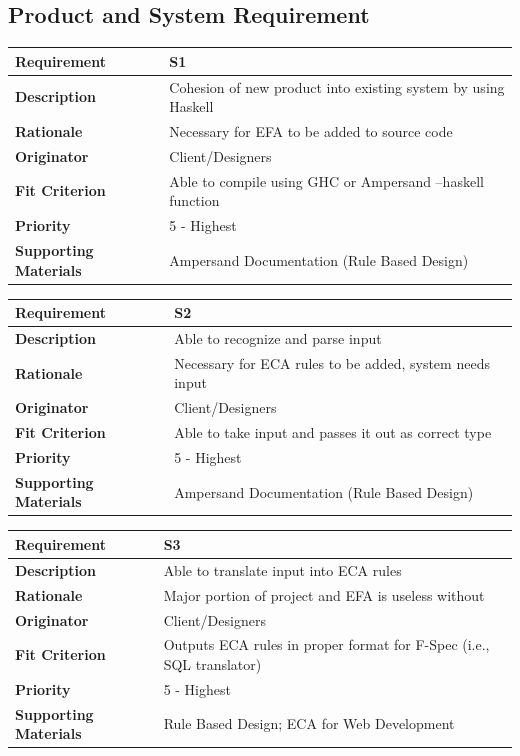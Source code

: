 \documentclass[12pt]{report}
\begin{document}
\subsection{Product and System Requirement}

{\setlength{\tabcolsep}{12pt} %
\begin{tabularx}{\textwidth}{>{\bfseries}m{3cm}X}
Requirement & S1 \\ 
\midrule
\endhead
Description  & Cohesion of new product into existing system by using Haskell  
\\	Rationale & Necessary for EFA to be added to source code 
\\	Originator & Client/Designers 
\\	Fit Criterion & Able to compile using GHC or Ampersand --haskell function  
\\	Priority & 5 - Highest
\\	Supporting Materials & Ampersand Documentation (Rule Based Design) 
\vspace{12pt}
\end{tabularx}
}


{\setlength{\tabcolsep}{12pt} %
\begin{tabularx}{\textwidth}{>{\bfseries}m{3cm}X}
Requirement & S2 \\ 
\midrule
\endhead
	Description  & Able to recognize and parse input 
	\\	Rationale & Necessary for ECA rules to be added, system needs input 
	\\	Originator & Client/Designers 
	\\	Fit Criterion & Able to take input and passes it out as correct type 
	\\	Priority & 5 - Highest
	\\	Supporting Materials & Ampersand Documentation (Rule Based Design) 
\vspace{12pt}
\end{tabularx}
}



{\setlength{\tabcolsep}{12pt} %
\begin{tabularx}{\textwidth}{>{\bfseries}m{3cm}X}
Requirement & S3 \\ 
\midrule
\endhead
	Description  & Able to translate input into ECA rules 
	\\	Rationale & Major portion of project and EFA is useless without 
	\\	Originator & Client/Designers 
	\\	Fit Criterion & Outputs ECA rules in proper format for F-Spec (i.e., SQL 
	translator) 
	\\	Priority & 5 - Highest 
	\\	Supporting Materials & Rule Based Design; ECA for Web Development %
\vspace{12pt}
\end{tabularx}
}
\end{document}
